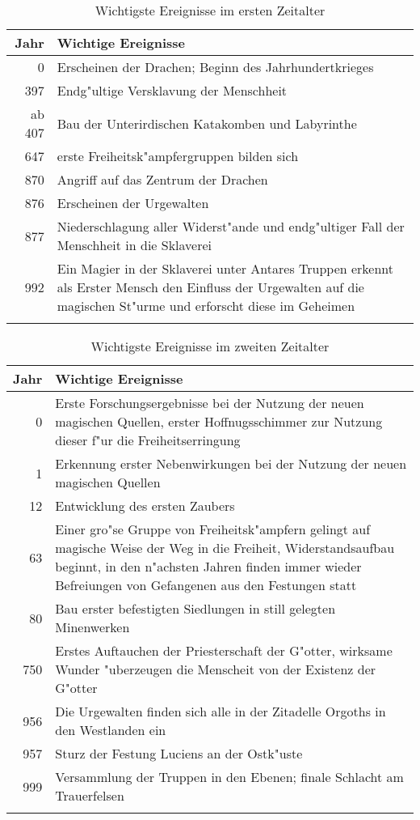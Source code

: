 \begin{longtable}{|r|p{10cm}|}
\hline
Jahr   & Wichtige Ereignisse \\
\hline
0      & Erscheinen der Drachen; Beginn des Jahrhundertkrieges\\
397    & Endg"ultige Versklavung der Menschheit\\
ab 407 & Bau der Unterirdischen Katakomben und Labyrinthe\\
647    & erste Freiheitsk"ampfergruppen bilden sich\\
870    & Angriff auf das Zentrum der Drachen\\
876    & Erscheinen der Urgewalten\\
877    & Niederschlagung aller Widerst"ande und endg"ultiger Fall der Menschheit in die Sklaverei\\
992    & Ein Magier in der Sklaverei unter Antares Truppen erkennt als Erster Mensch den Einfluss der Urgewalten auf die magischen St"urme und erforscht diese im Geheimen\\
\hline
\caption[Zeitleiste: Erstes Zeitalter]{Wichtigste Ereignisse im ersten Zeitalter}
\label{tabelle_zeitalter1}
\end{longtable}
\begin{longtable}{|r|p{10cm}|}
\hline
Jahr   & Wichtige Ereignisse \\
\hline
0      & Erste Forschungsergebnisse bei der Nutzung der neuen magischen Quellen, erster Hoffnugsschimmer zur Nutzung dieser f"ur die Freiheitserringung\\
1      & Erkennung erster Nebenwirkungen bei der Nutzung der neuen magischen Quellen\\
12     & Entwicklung des ersten Zaubers\\
63     & Einer gro"se Gruppe von Freiheitsk"ampfern gelingt auf magische Weise der Weg in die Freiheit, Widerstandsaufbau beginnt, in den n"achsten Jahren finden immer wieder Befreiungen von Gefangenen aus den Festungen statt\\
80     & Bau erster befestigten Siedlungen in still gelegten Minenwerken\\
750    & Erstes Auftauchen der Priesterschaft der G"otter, wirksame Wunder "uberzeugen die Menscheit von der Existenz der G"otter\\
956    & Die Urgewalten finden sich alle in der Zitadelle Orgoths in den Westlanden ein\\
957    & Sturz der Festung Luciens an der Ostk"uste\\
999    & Versammlung der Truppen in den Ebenen; finale Schlacht am Trauerfelsen\\
\hline
\caption[Zeitleiste: Zweites Zeitalter]{Wichtigste Ereignisse im zweiten Zeitalter}
\label{tabelle_zeitalter2}
\end{longtable}
